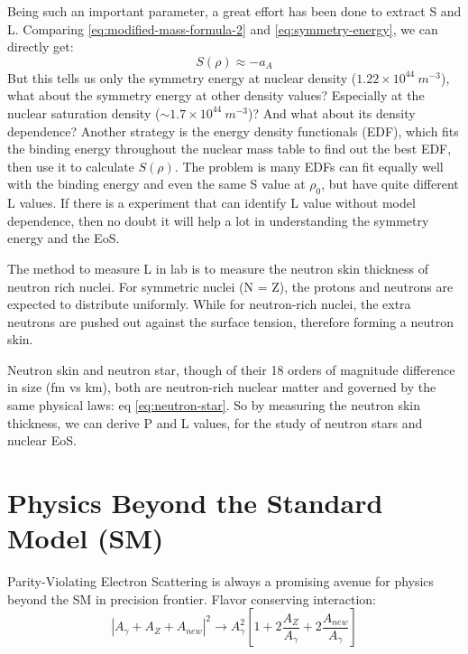 Being such an important parameter, a great effort has been done to extract S 
and L. Comparing \eqref{eq:modified-mass-formula-2} and \eqref{eq:symmetry-energy},
we can directly get:
\begin{equation}
    S(\rho) \approx -a_A
\end{equation}
But this tells us only the symmetry energy at nuclear density ($1.22 \times 10^{44}\ m^{-3}$),
what about the symmetry energy at other density values? Especially at the nuclear
saturation density ($\sim 1.7 \times 10^{44}\ m^{-3}$)? And what about its density
dependence? Another strategy is the energy density functionals (EDF), which fits
the binding energy throughout the nuclear mass table to find out the best EDF,
then use it to calculate $S(\rho)$. The problem is many EDFs can fit equally well
with the binding energy and even the same S value at $\rho_0$, but have quite 
different L values. If there is a experiment that can identify L value without 
model dependence, then no doubt it will help a lot in understanding the symmetry 
energy and the EoS.

The method to measure L in lab is to measure the neutron skin thickness of 
neutron rich nuclei. For symmetric nuclei (N = Z), the protons and neutrons are
expected to distribute uniformly. While for neutron-rich nuclei, the extra 
neutrons are pushed out against the surface tension\cite{PRL.85.5296}, therefore
forming a neutron skin. 

Neutron skin and neutron star, though of their 18 orders of magnitude difference 
in size (fm vs km), both are neutron-rich nuclear matter and governed by the 
same physical laws: eq \eqref{eq:neutron-star}. So by measuring the neutron
skin thickness, we can derive P and L values, for the study of neutron stars
and nuclear EoS.

\section{Physics Beyond the Standard Model (SM)} 
Parity-Violating Electron Scattering is always a promising avenue for physics
beyond the SM in precision frontier.
Flavor conserving interaction:
$$ |A_\gamma + A_Z + A_{new}|^2 \rightarrow A^2_\gamma\left[ 1 + 2\frac{A_Z}{A_\gamma}
 + 2\frac{A_{new}}{A_\gamma} \right]$$


